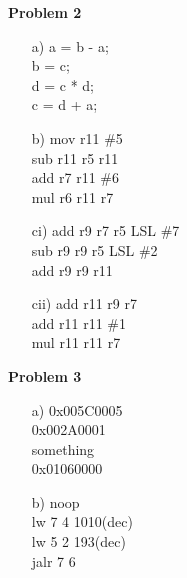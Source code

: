 \documentclass[a4paper,10pt]{article}
\begin{document}
\noindent\textbf{Problem 2}\\
\begin{itemize}
    \item[a)]
    a = b - a;\\
    b = c;\\
    d = c * d;\\
    c = d + a;\\
    
    \item[b)]
    mov r11 \#5\\
    sub r11 r5 r11\\
    add r7 r11 \#6\\
    mul r6 r11 r7\\
    
    \item[ci)]
    add r9 r7 r5 LSL \#7\\
    sub r9 r9 r5 LSL \#2\\
    add r9 r9 r11\\
    
    \item[cii)]
    add r11 r9 r7\\
    add r11 r11 \#1\\
    mul r11 r11 r7\\
    

\end{itemize}

\noindent\textbf{Problem 3}\\
\begin{itemize}
    \item[a)]
    0x005C0005\\
    0x002A0001\\
    something\\
    0x01060000\\
    
    \item[b)]
    noop\\
    lw 7 4 1010(dec)\\
    lw 5 2 193(dec)\\
    jalr 7 6\\
    

\end{itemize}
 
\end{document}
